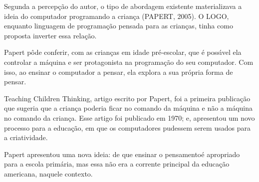 \documentclass[
12pt,		%
openright,	%
twoside,  %
a4paper,			%
chapter=TITLE,		%
english,			%
french,				%
spanish,			%
brazil				%
]{USPSC-classe/USPSC}
\begin{document}
Segunda a percep\c{c}\~ao do autor, o tipo de abordagem existente materializava a ideia do computador programando a crian\c{c}a (PAPERT, 2005). O LOGO, enquanto linguagem de programa\c{c}\~ao pensada para as crian\c{c}as, tinha como proposta inverter essa rela\c{c}\~ao.

















Papert p\^ode conferir, com as crian\c{c}as em idade pr\'e-escolar, que \'e poss\'{\i}vel ela controlar a m\'aquina e ser protagonista na programa\c{c}\~ao do seu computador. Com isso, ao ensinar o computador a pensar, ela explora a sua pr\'opria forma de pensar.

















Teaching Children Thinking, artigo escrito por Papert, foi a primeira publica\c{c}\~ao que sugeria que a crian\c{c}a poderia ficar no comando da m\'aquina e n\~ao a m\'aquina no comando da crian\c{c}a.  Esse artigo  foi publicado em 1970; e,  apresentou um novo processo para a educa\c{c}\~ao, em que os computadores pudessem serem usados para a criatividade.

















Papert apresentou uma nova ideia: de que \textquotedbl ensinar o pensamento\textquotedbl   \'e apropriado para a escola prim\'aria, mas essa n\~ao era a corrente principal da educa\c{c}\~ao americana, naquele contexto.
\end{document}
